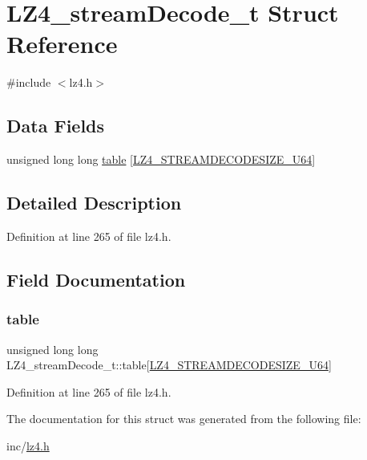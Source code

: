 \hypertarget{structLZ4__streamDecode__t}{}\section{L\+Z4\+\_\+stream\+Decode\+\_\+t Struct Reference}
\label{structLZ4__streamDecode__t}


{\ttfamily \#include $<$lz4.\+h$>$}

\subsection*{Data Fields}
\begin{DoxyCompactItemize}
\item 
unsigned long long \mbox{\hyperlink{structLZ4__streamDecode__t_a66753ac76e6b36336f3d4f3fb4714885}{table}} \mbox{[}\mbox{\hyperlink{lz4_8h_a414ecb38e0607f239de5ebca5a5beef5}{L\+Z4\+\_\+\+S\+T\+R\+E\+A\+M\+D\+E\+C\+O\+D\+E\+S\+I\+Z\+E\+\_\+\+U64}}\mbox{]}
\end{DoxyCompactItemize}


\subsection{Detailed Description}


Definition at line 265 of file lz4.\+h.



\subsection{Field Documentation}
\mbox{\label{structLZ4__streamDecode__t_a66753ac76e6b36336f3d4f3fb4714885}} 
\subsubsection{\texorpdfstring{table}{table}}
{\footnotesize\ttfamily unsigned long long L\+Z4\+\_\+stream\+Decode\+\_\+t\+::table\mbox{[}\mbox{\hyperlink{lz4_8h_a414ecb38e0607f239de5ebca5a5beef5}{L\+Z4\+\_\+\+S\+T\+R\+E\+A\+M\+D\+E\+C\+O\+D\+E\+S\+I\+Z\+E\+\_\+\+U64}}\mbox{]}}



Definition at line 265 of file lz4.\+h.



The documentation for this struct was generated from the following file\+:\begin{DoxyCompactItemize}
\item 
inc/\mbox{\hyperlink{lz4_8h}{lz4.\+h}}\end{DoxyCompactItemize}
